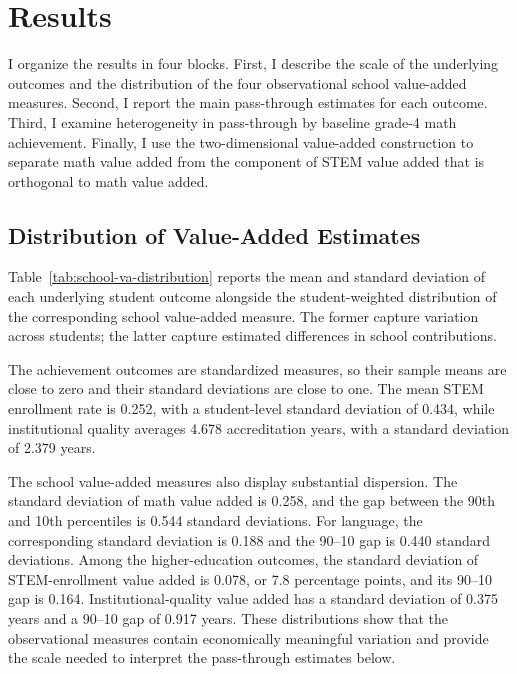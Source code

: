 \documentclass[a4paper, article, english, oneside, unknownkeysallowed, 12pt]{memoir}
\begin{document}
\clearpage 
\section{Results}

I organize the results in four blocks.
First, I describe the scale of the underlying outcomes and the distribution of the four observational school value-added measures.
Second, I report the main pass-through estimates for each outcome.
Third, I examine heterogeneity in pass-through by baseline grade-4 math achievement.
Finally, I use the two-dimensional value-added construction to separate math value added from the component of STEM value added that is orthogonal to math value added.

\subsection{Distribution of Value-Added Estimates}

Table~\ref{tab:school-va-distribution} reports the mean and standard deviation of each underlying student outcome alongside the student-weighted distribution of the corresponding school value-added measure.
The former capture variation across students; the latter capture estimated differences in school contributions.



The achievement outcomes are standardized measures, so their sample means are close to zero and their standard deviations are close to one.
The mean STEM enrollment rate is 0.252, with a student-level standard deviation of 0.434, while institutional quality averages 4.678 accreditation years, with a standard deviation of 2.379 years.

The school value-added measures also display substantial dispersion.
The standard deviation of math value added is 0.258, and the gap between the 90th and 10th percentiles is 0.544 standard deviations.
For language, the corresponding standard deviation is 0.188 and the 90--10 gap is 0.440 standard deviations.
Among the higher-education outcomes, the standard deviation of STEM-enrollment value added is 0.078, or 7.8 percentage points, and its 90--10 gap is 0.164.
Institutional-quality value added has a standard deviation of 0.375 years and a 90--10 gap of 0.917 years.
These distributions show that the observational measures contain economically meaningful variation and provide the scale needed to interpret the pass-through estimates below.
\end{document}
